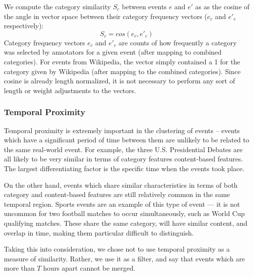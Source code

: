 We compute the category similarity $S_c$ between events $e$ and $e'$ as as the cosine of the angle in vector space between their category frequency vectors ($e_c$ and $e'_c$ respectively):
\begin{equation}
	S_c = cos(e_c, e'_c)
\end{equation}
Category frequency vectors $e_c$ and $e'_c$ are counts of how frequently a category was selected by annotators for a given event (after mapping to combined categories). For events from Wikipedia, the vector simply contained a 1 for the category given by Wikipedia (after mapping to the combined categories).
Since cosine is already length normalized, it is not necessary to perform any sort of length or weight adjustments to the vectors.

\subsubsection{Temporal Proximity}
Temporal proximity is extremely important in the clustering of events -- events which have a significant period of time between them are unlikely to be related to the same real-world event.
For example, the three U.S. Presidential Debates are all likely to be very similar in terms of category features content-based features.
The largest differentiating factor is the specific time when the events took place.

On the other hand, events which share similar characteristics in terms of both category and content-based features are still relatively common in the same temporal region.
Sports events are an example of this type of event --- it is not uncommon for two football matches to occur simultaneously, such as World Cup qualifying matches.
These share the same category, will have similar content, and overlap in time, making them particular difficult to distinguish.

Taking this into consideration, we chose not to use temporal proximity as a measure of similarity.
Rather, we use it as a filter, and say that events which are more than $T$ hours apart cannot be merged.

